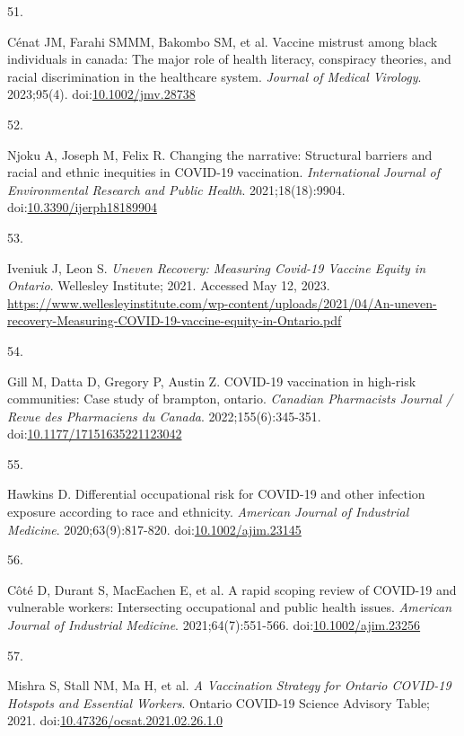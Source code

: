 \documentclass[
]{article}
\newlength{\cslhangindent}
\newlength{\csllabelwidth}
\newlength{\cslentryspacingunit} %
\newenvironment{CSLReferences}[2] %
 {%
  \setlength{\parindent}{0pt}
  \ifodd #1
  \let\oldpar\par
  \def\par{\hangindent=\cslhangindent\oldpar}
  \fi
  \setlength{\parskip}{#2\cslentryspacingunit}
 }%
 {}
\newcommand{\CSLLeftMargin}[1]{\parbox[t]{\csllabelwidth}{#1}}
\newcommand{\CSLRightInline}[1]{\parbox[t]{\linewidth - \csllabelwidth}{#1}\break}
\begin{document}
\begin{CSLReferences}{0}{0}
\leavevmode{}%
\CSLLeftMargin{51. }%
\CSLRightInline{Cénat JM, Farahi SMMM, Bakombo SM, et al. Vaccine
mistrust among black individuals in canada: The major role of health
literacy, conspiracy theories, and racial discrimination in the
healthcare system. \emph{Journal of Medical Virology}. 2023;95(4).
doi:\href{https://doi.org/10.1002/jmv.28738}{10.1002/jmv.28738}}

\leavevmode{}%
\CSLLeftMargin{52. }%
\CSLRightInline{Njoku A, Joseph M, Felix R. Changing the narrative:
Structural barriers and racial and ethnic inequities in {COVID}-19
vaccination. \emph{International Journal of Environmental Research and
Public Health}. 2021;18(18):9904.
doi:\href{https://doi.org/10.3390/ijerph18189904}{10.3390/ijerph18189904}}

\leavevmode{}%
\CSLLeftMargin{53. }%
\CSLRightInline{Iveniuk J, Leon S. \emph{Uneven Recovery: Measuring
Covid-19 Vaccine Equity in Ontario}. Wellesley Institute; 2021. Accessed
May 12, 2023.
\url{https://www.wellesleyinstitute.com/wp-content/uploads/2021/04/An-uneven-recovery-Measuring-COVID-19-vaccine-equity-in-Ontario.pdf}}

\leavevmode{}%
\CSLLeftMargin{54. }%
\CSLRightInline{Gill M, Datta D, Gregory P, Austin Z. {COVID}-19
vaccination in high-risk communities: Case study of brampton, ontario.
\emph{Canadian Pharmacists Journal / Revue des Pharmaciens du Canada}.
2022;155(6):345-351.
doi:\href{https://doi.org/10.1177/17151635221123042}{10.1177/17151635221123042}}

\leavevmode{}%
\CSLLeftMargin{55. }%
\CSLRightInline{Hawkins D. Differential occupational risk for {COVID}-19
and other infection exposure according to race and ethnicity.
\emph{American Journal of Industrial Medicine}. 2020;63(9):817-820.
doi:\href{https://doi.org/10.1002/ajim.23145}{10.1002/ajim.23145}}

\leavevmode{}%
\CSLLeftMargin{56. }%
\CSLRightInline{Côté D, Durant S, MacEachen E, et al. A rapid scoping
review of {COVID}-19 and vulnerable workers: Intersecting occupational
and public health issues. \emph{American Journal of Industrial
Medicine}. 2021;64(7):551-566.
doi:\href{https://doi.org/10.1002/ajim.23256}{10.1002/ajim.23256}}

\leavevmode{}%
\CSLLeftMargin{57. }%
\CSLRightInline{Mishra S, Stall NM, Ma H, et al. \emph{A Vaccination
Strategy for Ontario {COVID}-19 Hotspots and Essential Workers}. Ontario
{COVID}-19 Science Advisory Table; 2021.
doi:\href{https://doi.org/10.47326/ocsat.2021.02.26.1.0}{10.47326/ocsat.2021.02.26.1.0}}


\end{CSLReferences}
\end{document}
